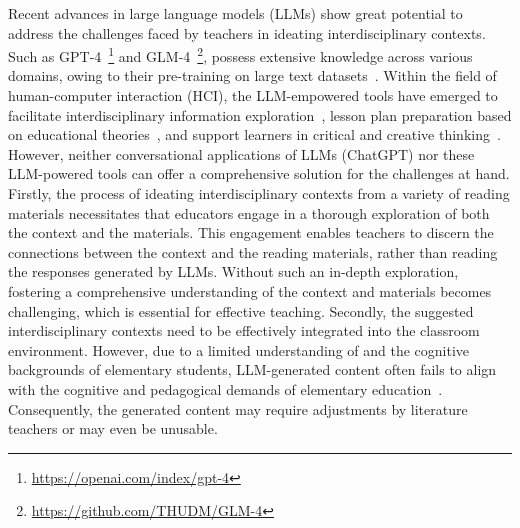 Recent advances in large language models (LLMs) show great potential to address the challenges faced by teachers in ideating interdisciplinary contexts.
Such as GPT-4~\footnote{\url{https://openai.com/index/gpt-4}} and GLM-4~\footnote{\url{https://github.com/THUDM/GLM-4}}, possess extensive knowledge across various domains, owing to their pre-training on large text datasets~\cite{NEURIPS2020_1457c0d6}.
Within the field of human-computer interaction (HCI), the LLM-empowered tools have emerged to facilitate interdisciplinary information exploration~\cite{zheng2024disciplink}, lesson plan preparation based on educational theories~\cite{fan2024lessonplanner}, and support learners in critical and creative thinking~\cite{yuan2023critrainer, shaer2024ai}. %
However, neither conversational applications of LLMs (\eg ChatGPT) nor these LLM-powered tools can offer a comprehensive solution for the challenges at hand. 
Firstly, the process of ideating interdisciplinary contexts from a variety of reading materials necessitates that educators engage in a thorough exploration of both the context and the materials. 
This engagement enables teachers to discern the connections between the context and the reading materials, rather than reading the responses generated by LLMs. Without such an in-depth exploration, fostering a comprehensive understanding of the context and materials becomes challenging, which is essential for effective teaching. 
Secondly, the suggested interdisciplinary contexts need to be effectively integrated into the classroom environment.
However, due to a limited understanding of 
 and the cognitive backgrounds of elementary students, LLM-generated content often fails to align with the cognitive and pedagogical demands of elementary education~\cite{fan2024lessonplanner}.
Consequently, the generated content may require adjustments by literature teachers or may even be unusable. 

